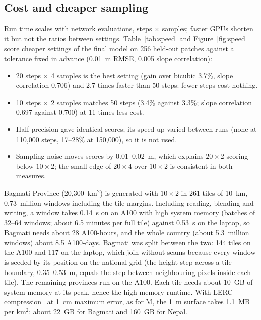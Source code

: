 \documentclass[11pt]{article}
\begin{document}
\subsection{Cost and cheaper sampling}
\label{sec:cost}
Run time scales with network evaluations, steps $\times$ samples; faster GPUs shorten it but not the ratios between
settings. Table~\ref{tab:speed} and Figure~\ref{fig:speed} score cheaper settings of the final model on 256 held-out
patches against a tolerance fixed in advance (0.01~m RMSE, 0.005 slope correlation):
\begin{itemize}\setlength\itemsep{1pt}
\item 20 steps $\times$ 4 samples is the best setting (gain over bicubic 3.7\%, slope correlation 0.706) and 2.7 times
faster than 50 steps: fewer steps cost nothing.
\item 10 steps $\times$ 2 samples matches 50 steps (3.4\% against 3.3\%; slope correlation 0.697 against 0.700) at 11 times
less cost.
\item Half precision gave identical scores; its speed-up varied between runs (none at 110{,}000 steps, 17--28\% at
150{,}000), so it is not used.
\item Sampling noise moves scores by 0.01--0.02~m, which explains $20\times2$ scoring below $10\times2$; the small edge of
$20\times4$ over $10\times2$ is consistent in both measures.
\end{itemize}
Bagmati Province (20{,}300~km$^2$) is generated with $10\times2$ in 261 tiles of 10~km, 0.73~million windows
including the tile margins. Including reading, blending and writing, a window takes 0.14~s on an A100 with high system
memory (batches of 32--64 windows; about 6.5 minutes per full tile) against 0.53~s on the laptop, so Bagmati needs about
28 A100-hours, and the whole country (about 5.3~million windows) about 8.5 A100-days. Bagmati was split between the two:
144 tiles on the A100 and 117 on the laptop, which join without seams because every window is seeded by its position on
the national grid (the height step across a tile boundary, 0.35--0.53~m, equals the step between neighbouring pixels
inside each tile). The remaining provinces run on the A100. Each tile needs about 10~GB of system memory at its peak,
hence the high-memory runtime. With
LERC compression~\citep{esri_lerc} at 1~cm maximum error, as for M, the 1~m surface takes 1.1~MB per km$^2$: about 22~GB
for Bagmati and 160~GB for Nepal.
\end{document}
